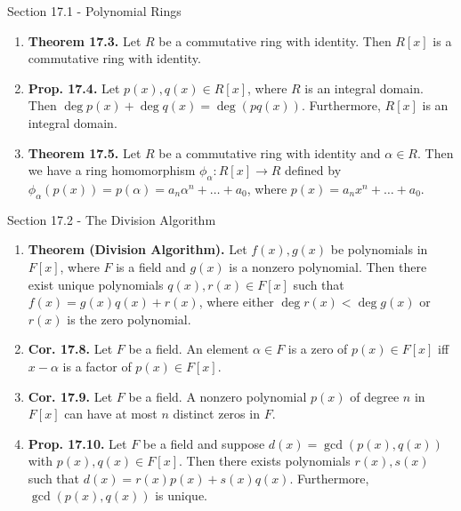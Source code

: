 \documentclass[12pt]{article}
\theoremstyle{definition}
\theoremstyle{named}
\begin{document}
\begin{section}{Section 17.1 - Polynomial Rings}
    \begin{enumerate}
        \item \textbf{Theorem 17.3. } Let $R$ be a commutative ring with identity. Then $R[x]$ is a commutative ring with identity. 
        \item \textbf{Prop. 17.4. } Let $p(x),q(x) \in R[x]$, where $R$ is an integral domain. Then $\deg p(x) + \deg q(x) = \deg(pq(x))$. Furthermore, $R[x]$ is an integral domain. 
        \item \textbf{Theorem 17.5. } Let $R$ be a commutative ring with identity and $\alpha \in R$. Then we have a ring homomorphism $\phi_\alpha: R[x] \to R$ defined by $\phi_\alpha(p(x)) = p(\alpha) = a_n\alpha^n + \dots + a_0$, where $p(x) = a_nx^n + \dots + a_0$. 
    \end{enumerate}
\end{section}

\begin{section}{Section 17.2 - The Division Algorithm}
    \begin{enumerate}
        \item \textbf{Theorem (Division Algorithm). } Let $f(x),g(x)$ be polynomials in $F[x]$, where $F$ is a field and $g(x)$ is a nonzero polynomial. Then there exist unique polynomials $q(x),r(x) \in F[x]$ such that $f(x) = g(x)q(x)+r(x)$, where either $\deg r(x) < \deg g(x)$ or $r(x)$ is the zero polynomial. 
        \item \textbf{Cor. 17.8. } Let $F$ be a field. An element $\alpha \in F$ is a zero of $p(x) \in F[x]$ iff $x-\alpha$ is a factor of $p(x) \in F[x]$. 
        \item \textbf{Cor. 17.9. } Let $F$ be a field. A nonzero polynomial $p(x)$ of degree $n$ in $F[x]$ can have at most $n$ distinct zeros in $F$. 
        \item \textbf{Prop. 17.10. } Let $F$ be a field and suppose $d(x) = \gcd(p(x),q(x))$ with $p(x),q(x) \in F[x]$. Then there exists polynomials $r(x),s(x)$ such that $d(x) = r(x)p(x) + s(x)q(x)$. Furthermore, $\gcd(p(x),q(x))$ is unique. 
    \end{enumerate}
\end{section}
\end{document}
